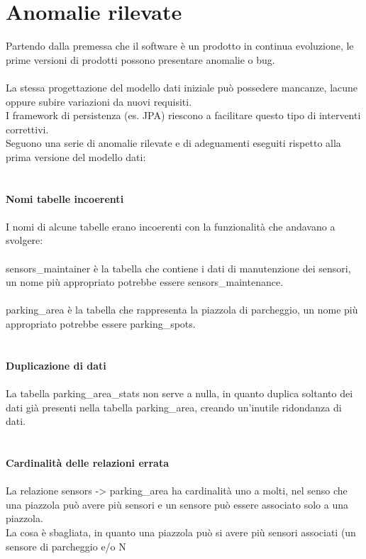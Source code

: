 \section{Anomalie rilevate}
Partendo dalla premessa che il software è un prodotto in continua evoluzione, le prime versioni
di prodotti possono presentare anomalie o bug.
\\\\
La stessa progettazione del modello dati iniziale può possedere mancanze, lacune oppure subire variazioni da nuovi requisiti. 
\\
I framework di persistenza (es. JPA) 
riescono a facilitare questo tipo di interventi correttivi.
\\
Seguono una serie di anomalie rilevate e di adeguamenti eseguiti rispetto alla prima versione del modello dati:
\\\\\\
\textbf{Nomi tabelle incoerenti}
\\\\
I nomi di alcune tabelle erano incoerenti con la funzionalità che andavano a svolgere:
\\\\
sensors\_maintainer è la tabella che contiene i dati di manutenzione dei sensori, un 
nome più appropriato potrebbe essere sensors\_maintenance.
\\\\
parking\_area è la tabella che rappresenta la piazzola di parcheggio, un nome più appropriato
potrebbe essere parking\_spots.
\\\\\\
\clearpage
\leavevmode\newline
\textbf{Duplicazione di dati}
\\\\
La tabella parking\_area\_stats non serve a nulla, in quanto duplica soltanto dei dati già presenti
nella tabella parking\_area, creando un'inutile ridondanza di dati.
\\\\\\
\textbf{Cardinalità delle relazioni errata}
\\\\
La relazione sensors -> parking\_area ha cardinalità uno a molti, nel senso che una piazzola può avere
più sensori e un sensore può essere associato solo a una piazzola. 
\\
La cosa è sbagliata, in quanto una piazzola può si avere più sensori associati (un sensore di parcheggio e/o N
